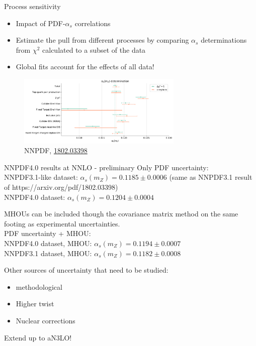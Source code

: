 \documentclass[8pt,t]{beamer}
\begin{document}
\begin{frame}{Process sensitivity}
  \begin{itemize}
    \item Impact of PDF-$\alpha_s$ correlations
    \item Estimate the pull from different processes by comparing $\alpha_s$ determinations from $\chi^2$ calculated to a subset of the data
    \item Global fits account for the effects of all data!
  \end{itemize}
  \begin{figure}
    \includegraphics[width=0.7\textwidth]{as_determination_central_NNLO.pdf}
    \caption*{\color{gray} \footnotesize NNPDF, \hyperlink{https://arxiv.org/abs/1802.03398}{1802.03398}}
  \end{figure}
\end{frame}


\begin{frame}{NNPDF4.0 results at NNLO - preliminary}
  Only PDF uncertainty: \\
  NNPDF3.1-like dataset: $\alpha_s(m_Z) = 0.1185 \pm 0.0006$ (same as NNPDF3.1 result of https://arxiv.org/pdf/1802.03398)\\
  NNPDF4.0 dataset: $\alpha_s(m_Z) = 0.1204 ± 0.0004$

  \vspace*{1em}
  MHOUs can be included though the covariance matrix method on the same footing as experimental uncertainties.\\
  PDF uncertainty + MHOU: \\
  NNPDF4.0 dataset, MHOU: $\alpha_s(m_Z)=0.1194 \pm 0.0007$ \\
  NNPDF3.1 dataset, MHOU: $\alpha_s(m_Z) = 0.1182 \pm 0.0008$

  \vspace*{1em}
  Other sources of uncertainty that need to be studied:
  \begin{itemize}
    \item methodological
    \item Higher twist
    \item Nuclear corrections
  \end{itemize}

  Extend up to aN3LO!

\end{frame}
\end{document}
